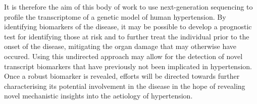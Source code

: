 It is therefore the aim of this body of work to use next-generation sequencing to profile the transcriptome of a genetic model of human hypertension. By identifying biomarkers of the disease, it may be possible to develop a prognostic test for identifying those at risk and to further treat the individual prior to the onset of the disease, mitigating the organ damage that may otherwise have occured. Using this undirected approach may allow for the detection of novel transcript biomarkers that have previously not been implicated in hypertension. Once a robust biomarker is revealed, efforts will be directed towards further characterising its potential involvement in the disease in the hope of revealing novel mechanistic insights into the aetiology of hypertension. 













